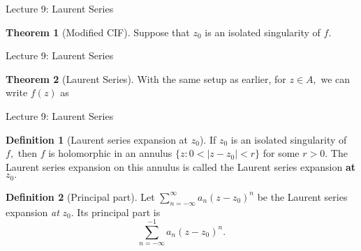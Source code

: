 \documentclass[handout, dvipsnames]{beamer}
\theoremstyle{definition}
\newtheorem{defn}{Definition}
\newtheorem{thm}{Theorem}
\begin{document}
\begin{frame}{Lecture 9: Laurent Series}
    \begin{thm}[Modified CIF]
    Suppose that $z_0$ is an isolated singularity of $f.$  
    \end{thm}
\end{frame}
\begin{frame}{Lecture 9: Laurent Series}
    \begin{thm}[Laurent Series]
        With the same setup as earlier, for $z \in A,$ we can write $f(z)$ as 
    \end{thm}
\end{frame}
\begin{frame}{Lecture 9: Laurent Series}
   \begin{defn}[Laurent series expansion at $z_0$]
        If $z_0$ is an isolated singularity of $f,$ then $f$ is holomorphic in an annulus $\{z : 0 < |z - z_0| < r\}$ for some $r > 0.$ The Laurent series expansion on this annulus is called the Laurent series expansion \textbf{at} $z_0.$ 
   \end{defn}
   \begin{defn}[Principal part]
       Let $\displaystyle\sum_{n = -\infty}^{\infty}a_n(z - z_0)^n$ be the Laurent series expansion \emph{at} $z_0.$ Its principal part is 
       \begin{equation*} 
           \displaystyle\sum_{n = -\infty}^{-1}a_n(z - z_0)^n.
       \end{equation*}
   \end{defn}
\end{frame}
\end{document}
